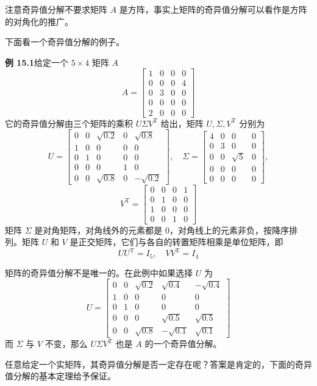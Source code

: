 \documentclass[UTF8, 12pt, fontset=fandol, oneside]{ctexart}
\begin{document}
注意奇异值分解不要求矩阵 $A$ 是方阵，事实上矩阵的奇异值分解可以看作是方阵的对角化的推广。

下面看一个奇异值分解的例子。

\noindent\textbf{例 15.1}\quad 给定一个 $5\times4$ 矩阵 $A$
\[
A=
\begin{bmatrix}
1&0&0&0\\
0&0&0&4\\
0&3&0&0\\
0&0&0&0\\
2&0&0&0
\end{bmatrix}
\]
它的奇异值分解由三个矩阵的乘积 $U\Sigma V^{\mathrm{T}}$ 给出，矩阵 $U,\Sigma,V^{\mathrm{T}}$ 分别为
\[
U=
\begin{bmatrix}
0&0&\sqrt{0.2}&0&\sqrt{0.8}\\
1&0&0&0&0\\
0&1&0&0&0\\
0&0&0&1&0\\
0&0&\sqrt{0.8}&0&-\sqrt{0.2}
\end{bmatrix},
\quad
\Sigma=
\begin{bmatrix}
4&0&0&0\\
0&3&0&0\\
0&0&\sqrt5&0\\
0&0&0&0\\
0&0&0&0
\end{bmatrix},
\]
\[
V^{\mathrm{T}}=
\begin{bmatrix}
0&0&0&1\\
0&1&0&0\\
1&0&0&0\\
0&0&1&0
\end{bmatrix}
\]
矩阵 $\Sigma$ 是对角矩阵，对角线外的元素都是 0，对角线上的元素非负，按降序排列。矩阵 $U$ 和 $V$ 是正交矩阵，它们与各自的转置矩阵相乘是单位矩阵，即
\[
UU^{\mathrm{T}}=I_5,\quad VV^{\mathrm{T}}=I_4
\]

矩阵的奇异值分解不是唯一的。在此例中如果选择 $U$ 为
\[
U=
\begin{bmatrix}
0&0&\sqrt{0.2}&\sqrt{0.4}&-\sqrt{0.4}\\
1&0&0&0&0\\
0&1&0&0&0\\
0&0&0&\sqrt{0.5}&\sqrt{0.5}\\
0&0&\sqrt{0.8}&-\sqrt{0.1}&\sqrt{0.1}
\end{bmatrix}
\]
而 $\Sigma$ 与 $V$ 不变，那么 $U\Sigma V^{\mathrm{T}}$ 也是 $A$ 的一个奇异值分解。

任意给定一个实矩阵，其奇异值分解是否一定存在呢？答案是肯定的，下面的奇异值分解的基本定理给予保证。
\end{document}
